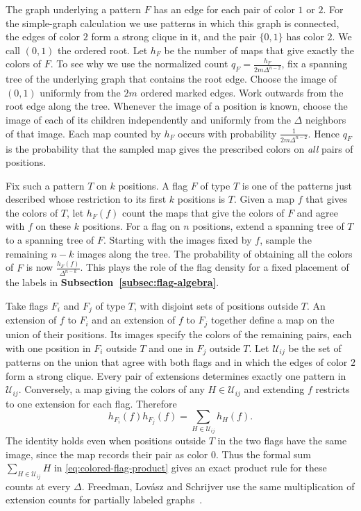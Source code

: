 \documentclass[preprint,11pt,numbers]{elsarticle-arxiv}
\numberwithin{equation}{section}
\theoremstyle{definition}
\begin{document}
The graph underlying a pattern $F$ has an edge for each pair of
color $1$ or $2$. For the simple-graph calculation we use patterns
in which this graph is connected, the edges of color $2$ form a strong
clique in it, and the pair $\{0,1\}$ has color $2$. We call $(0,1)$
the ordered root. Let $h_F$ be the number of maps that give exactly
the colors of $F$. To see why we use the normalized count
$q_F=\frac{h_F}{2m\Delta^{n-2}}$, fix a spanning tree of the underlying
graph that contains the root edge. Choose the image of $(0,1)$
uniformly from the $2m$ ordered marked edges. Work outwards from the
root edge along the tree. Whenever the image of a position is known,
choose the image of each of its children independently and uniformly
from the $\Delta$ neighbors of that image. Each map counted by $h_F$
occurs with probability $\frac{1}{2m\Delta^{n-2}}$. Hence $q_F$ is the
probability that the sampled map gives the prescribed colors on
\emph{all} pairs of positions.

Fix such a pattern $T$ on $k$ positions. A flag $F$ of type $T$
is one of the patterns just described whose restriction to its first
$k$ positions is $T$. Given a map $f$ that gives the colors of $T$,
let $h_F(f)$ count the maps that give the colors of $F$ and agree
with $f$ on these $k$ positions. For a flag on $n$ positions, extend
a spanning tree of $T$ to a spanning tree of $F$. Starting with the
images fixed by $f$, sample the remaining $n-k$ images along the
tree. The probability of obtaining all the colors of $F$ is now
$\frac{h_F(f)}{\Delta^{n-k}}$. This plays the role of the flag
density for a fixed placement of the labels in
\textbf{Subsection~\ref{subsec:flag-algebra}}.

Take flags $F_i$ and $F_j$ of type $T$, with disjoint sets of positions
outside $T$. An extension of $f$ to $F_i$ and an extension of $f$ to
$F_j$ together define a map on the union of their positions. Its images
specify the colors of the remaining pairs, each with one position
in $F_i$ outside $T$ and one in $F_j$ outside $T$. Let
$\mathcal U_{ij}$ be the set of patterns on the union that agree with
both flags and in which the edges of color $2$ form a strong clique.
Every pair of extensions determines exactly one pattern in
$\mathcal U_{ij}$. Conversely, a map giving the colors of any
$H\in\mathcal U_{ij}$ and extending $f$ restricts to one extension
for each flag. Therefore
\[
 h_{F_i}(f)h_{F_j}(f)=\sum_{H\in\mathcal U_{ij}}h_H(f).
\]
The identity holds even when positions outside $T$ in the two flags
have the same image, since the map records their pair as color $0$.
Thus the formal sum $\sum_{H\in\mathcal U_{ij}}H$ in
\eqref{eq:colored-flag-product} gives an exact product rule for these
counts at every $\Delta$. Freedman, Lov\'asz and Schrijver use the
same multiplication of extension counts for partially labeled
graphs~\cite{FreedmanLovaszSchrijver2007}.
\end{document}
